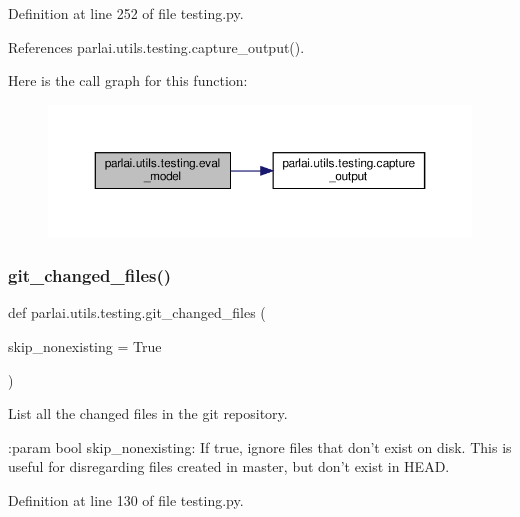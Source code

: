 Definition at line 252 of file testing.\+py.



References parlai.\+utils.\+testing.\+capture\+\_\+output().

Here is the call graph for this function\+:
\nopagebreak
\begin{figure}[H]
\begin{center}
\leavevmode
\includegraphics[width=350pt]{namespaceparlai_1_1utils_1_1testing_a6fb595d4398ee27f4d183911419a222a_cgraph}
\end{center}
\end{figure}
\mbox{\label{namespaceparlai_1_1utils_1_1testing_a2e61f8f35b8ccf518e3561a224781ced}} 
\subsubsection{\texorpdfstring{git\+\_\+changed\+\_\+files()}{git\_changed\_files()}}
{\footnotesize\ttfamily def parlai.\+utils.\+testing.\+git\+\_\+changed\+\_\+files (\begin{DoxyParamCaption}\item[{}]{skip\+\_\+nonexisting = {\ttfamily True} }\end{DoxyParamCaption})}

\begin{DoxyVerb}List all the changed files in the git repository.

:param bool skip_nonexisting:
    If true, ignore files that don't exist on disk. This is useful for
    disregarding files created in master, but don't exist in HEAD.
\end{DoxyVerb}
 

Definition at line 130 of file testing.\+py.

\mbox{\label{namespaceparlai_1_1utils_1_1testing_aa9971204bea89f174596698b2e736214}} 
